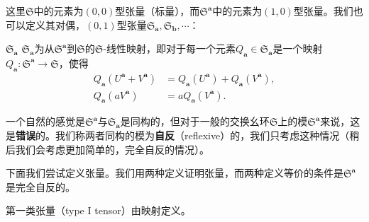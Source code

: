 这里$\mathfrak{S}$中的元素为$( 0,0)$型张量（标量），而$\mathfrak{S}^{\boldsymbol{a}}$中的元素为$( 1,0)$型张量。我们也可以定义其对偶，$( 0,1)$型张量$\mathfrak{S}_{\boldsymbol{a}} ,\mathfrak{S}_{\boldsymbol{b}} ,\cdots $：

\begin{defi}[label={defi:dualfraSa}]{$\mathfrak{S}_{\boldsymbol{a}}$}
	$\mathfrak{S}_{\boldsymbol{a}}$为从$\mathfrak{S}^{\boldsymbol{a}}$到$\mathfrak{S}$的$\mathfrak{S}$-线性映射，即对于每一个元素$Q_{\boldsymbol{a}} \in \mathfrak{S}_{\boldsymbol{a}}$是一个映射$Q_{\boldsymbol{a}} :\mathfrak{S}^{\boldsymbol{a}}\rightarrow \mathfrak{S}$，使得
	\begin{equation*}
		\begin{aligned}
			Q_{\boldsymbol{a}} (U^{\boldsymbol{a}} +V^{\boldsymbol{a}} ) & =Q_{\boldsymbol{a}} (U^{\boldsymbol{a}} )+Q_{\boldsymbol{a}} (V^{\boldsymbol{a}} ),\\
			Q_{\boldsymbol{a}} (aV^{\boldsymbol{a}} ) & =aQ_{\boldsymbol{a}} (V^{\boldsymbol{a}} ).
		\end{aligned}
	\end{equation*}
\end{defi}

一个自然的感觉是$\mathfrak{S}^{\boldsymbol{a}}$与$\mathfrak{S}_{\boldsymbol{a}}$是同构的，但对于一般的交换幺环$\mathfrak{S}$上的模$\mathfrak{S}^{\boldsymbol{a}}$来说，这是\textbf{错误}的。我们称两者同构的模为\textbf{自反}（reflexive）的，我们只考虑这种情况（稍后我们会考虑更加简单的，完全自反的情况）。



下面我们尝试定义张量。我们用两种定义证明张量，而两种定义等价的条件是$\mathfrak{S}^{\boldsymbol{a}}$是完全自反的。



第一类张量（type I tensor）由映射定义。

